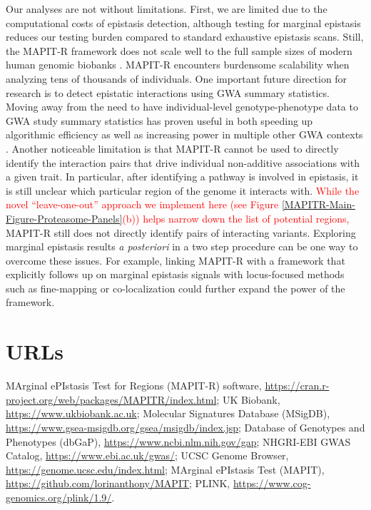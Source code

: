 \documentclass[10pt]{article}
\begin{document}
Our analyses are not without limitations. First, we are limited due to the computational costs of epistasis detection, although testing for marginal epistasis reduces our testing burden compared to standard exhaustive epistasis scans. Still, the MAPIT-R framework does not scale well to the full sample sizes of modern human genomic biobanks \cite{Crawford2017a,Crawford2018a,Moore2019}. MAPIT-R encounters burdensome scalability when analyzing tens of thousands of individuals. One important future direction for research is to detect epistatic interactions using GWA summary statistics. Moving away from the need to have individual-level genotype-phenotype data to GWA study summary statistics has proven useful in both speeding up algorithmic efficiency as well as increasing power in multiple other GWA contexts \cite{Shi2016,Johnson2018,Ray2018,Turchin2019,Urbut2019,Cheng2020}. Another noticeable limitation is that MAPIT-R cannot be used to directly identify the interaction pairs that drive individual non-additive associations with a given trait. In particular, after identifying a pathway is involved in epistasis, it is still unclear which particular region of the genome it interacts with. \textcolor{red}{While the novel ``leave-one-out'' approach we implement here (see Figure \ref{MAPITR-Main-Figure-Proteasome-Panels}(b)) helps narrow down the list of potential regions,} MAPIT-R still does not directly identify pairs of interacting variants. Exploring marginal epistasis results \textit{a posteriori} in a two step procedure can be one way to overcome these issues. For example, linking MAPIT-R with a framework that explicitly follows up on marginal epistasis signals with locus-focused methods such as fine-mapping \cite{Kichaev2014,Chen2015,Benner2016} or co-localization \cite{Hormozdiari2016,Zhu2016,Wen2017,Giambartolomei2018,Wallace2020} could further expand the power of the framework. 


\section*{URLs}\label{MAPITR-URLs}

MArginal ePIstasis Test for Regions (MAPIT-R) software, \url{https://cran.r-project.org/web/packages/MAPITR/index.html}; UK Biobank, \url{https://www.ukbiobank.ac.uk}; Molecular Signatures Database (MSigDB), \url{https://www.gsea-msigdb.org/gsea/msigdb/index.jsp}; Database of Genotypes and Phenotypes (dbGaP), \url{https://www.ncbi.nlm.nih.gov/gap}; NHGRI-EBI GWAS Catalog, \url{https://www.ebi.ac.uk/gwas/}; UCSC Genome Browser, \url{https://genome.ucsc.edu/index.html}; MArginal ePIstasis Test (MAPIT), \url{https://github.com/lorinanthony/MAPIT}; PLINK, \url{https://www.cog-genomics.org/plink/1.9/}.
\end{document}
